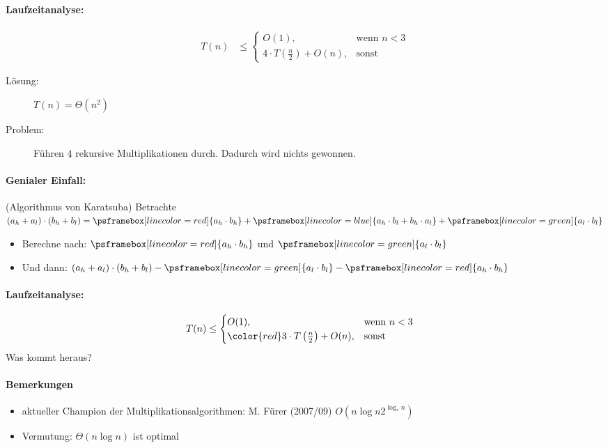 \begin{itemize}
        \paragraph{Laufzeitanalyse:}
        \begin{align*}
         T(n) &\leq \begin{cases}
                     O(1), & \text{wenn $n < 3$}\\
                     4 \cdot T\left(\frac{n}{2}\right) + O(n), & \text{sonst}
                    \end{cases}
        \end{align*}
        \begin{description}
        \item[Lösung:]  $T(n) = \Theta(n^2)$
        \item[Problem:] Führen $\underline{4}$ rekursive Multiplikationen durch. Dadurch wird nichts gewonnen.
        \end{description}
        \paragraph*{Genialer Einfall:} (Algorithmus von Karatsuba)
        Betrachte $(a_h + a_l) \cdot (b_h + b_l) = \psframebox[linecolor=red]{a_h \cdot b_h} + \psframebox[linecolor=blue]{a_h \cdot b_l + b_h \cdot a_l} + \psframebox[linecolor=green]{a_l \cdot b_l}$
        \begin{itemize}
        \item   Berechne nach: $\psframebox[linecolor=red]{a_h \cdot b_h}$ und $\psframebox[linecolor=green]{a_l \cdot b_l}$
        \item   Und dann: $(a_h + a_l) \cdot (b_h + b_l) - \psframebox[linecolor=green]{a_l \cdot b_l} - \psframebox[linecolor=red]{a_h \cdot b_h}$
        \end{itemize}
        \paragraph*{Laufzeitanalyse:}
        \begin{align*}
         T(n) &\leq \begin{cases}
                     O(1), & \text{wenn $n < 3$}\\
                     {\color{red}3} \cdot T\left(\frac{n}{2}\right) + O(n), & \text{sonst}
                    \end{cases}
        \end{align*}
        Was kommt heraus?
    \paragraph*{Bemerkungen}
    \begin{itemize}
     \item aktueller Champion der Multiplikationsalgorithmen: M. Fürer (2007/09) $O(n \log n 2^{\log_* n})$
     \item Vermutung: $\Theta(n \log n)$ ist optimal
    \end{itemize}
\end{itemize}

